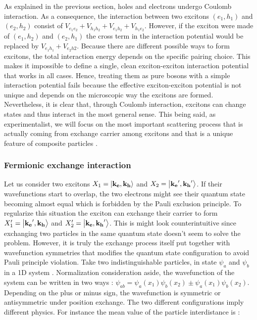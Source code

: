 As explained in the previous section, holes and electrons undergo Coulomb interaction. As a consequence, the interaction
between two excitons $(e_1,h_1)$ and $(e_2,h_2)$ consist of $V_{e_1e_2}+V_{h_1h_2}+V_{e_1h_2}+V_{h_1e_2}$. However, if the exciton were made of $(e_1,h_2)$ and $(e_2,h_1)$ the cross term in the interaction potential would be replaced
by $V_{e_1h_1}+V_{e_2h2}$. Because there are different possible ways to form excitons, the total interaction energy depends on the specific pairing choice.
This makes it impossible to define a single, clean exciton-exciton interaction potential that works in all cases.
Hence, treating them as pure bosons with a simple interaction potential fails because the effective exciton-exciton potential is not unique and depends on the microscopic way the excitons are formed.
Nevertheless, it is clear that, through Coulomb interaction, excitons can change states and thus interact in the most general sense. This being said, as experimentalist, we will focus on the most 
important scattering process that is actually coming from exchange carrier among excitons and that is a unique feature of composite particles \cite{ciuti_carrier_exchanges_1998,Combescot_cooper_excitons_2015}.

\subsubsection{Fermionic exchange interaction}

Let us consider two excitons $X_1=\ket{\mathbf{k_e},\mathbf{k_h}}$ and $X_2=\ket{\mathbf{k_e}',\mathbf{k_h}'}$. If their wavefunctions
start to overlap, the two electrons might see their quantum state becoming almost equal which is forbidden by the Pauli exclusion principle. To regularize this situation 
the exciton can exchange their carrier to form $X'_1=\ket{\mathbf{k_e}',\mathbf{k_h}}$ and $X'_2=\ket{\mathbf{k_e},\mathbf{k_h}'}$. This is might look counterintuitive since exchanging two particles in the same quantum state doesn't seem to solve the problem. However,
it is truly the exchange process itself put together with wavefunction symmetries that modifies the quantum state configuration to avoid Pauli principle violation.
Take two indistinguishable particles, in state $\psi_a$ and $\psi_b$ in a 1D system  \cite{CCT_tome2}. Normalization consideration aside, the wavefunction of the system can be written in two ways : $\psi_{ab} =\psi_a(x_1)\psi_b(x_2) \pm \psi_a(x_1)\psi_b(x_2)$.
Depending on the plus or minus sign, the wavefunction is symmetric or antisymmetric under position exchange. The two different configurations imply different physics.
For instance the mean value of the particle interdistance is :


